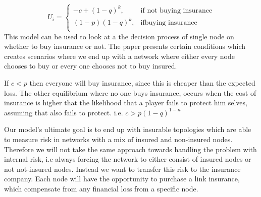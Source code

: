 \begin{equation}
    U_{i}= 
\begin{cases}
    -c + (1-q)^k ,& \text{if not buying insurance} \\
   (1-p)(1-q)^k,& \text{ifbuying insurance }  \\
    
    
\end{cases}
\label{eq:riskModel}
\end{equation}
 This model can be used to look at a the decision process of single node on whether to buy insurance or not. The paper presents certain conditions which creates scenarios where we end up with a network where either every node chooses to buy or every one chooses not to buy insured. 

If $c<p$ then everyone will buy insurance, since this is cheaper than the expected loss. The other equilibrium where no one buys insurance, occurs when the cost of insurance is higher that the likelihood that a player fails to protect him selves, assuming that also fails to protect. i.e. $c>p(1-q)^{1-n}$
 
Our model's ultimate goal is to end up with insurable topologies which are able to measure risk in networks with a mix of insured and non-insured nodes. Therefore we will not take the same approach towards handling the problem with internal risk, i.e always forcing the network to either consist of insured nodes or not not-insured nodes. Instead we want to transfer this risk to the insurance company. Each node will have the opportunity to purchase a link insurance, which compensate from any financial loss from a specific node. 